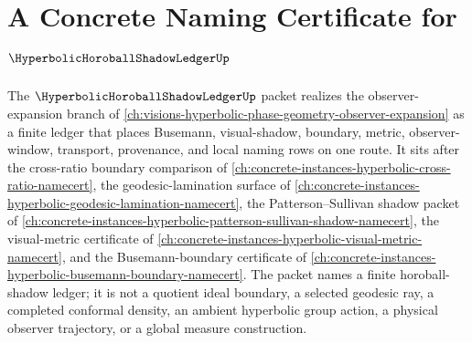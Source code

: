 \chapter{A Concrete Naming Certificate for $\HyperbolicHoroballShadowLedgerUp$}
\label{ch:concrete-instances-hyperbolic-horoball-shadow-ledger-namecert}

The $\HyperbolicHoroballShadowLedgerUp$ packet realizes the observer-expansion branch of \autoref{ch:visions-hyperbolic-phase-geometry-observer-expansion} as a finite ledger that places Busemann, visual-shadow, boundary, metric, observer-window, transport, provenance, and local naming rows on one route. It sits after the cross-ratio boundary comparison of \autoref{ch:concrete-instances-hyperbolic-cross-ratio-namecert}, the geodesic-lamination surface of \autoref{ch:concrete-instances-hyperbolic-geodesic-lamination-namecert}, the Patterson--Sullivan shadow packet of \autoref{ch:concrete-instances-hyperbolic-patterson-sullivan-shadow-namecert}, the visual-metric certificate of \autoref{ch:concrete-instances-hyperbolic-visual-metric-namecert}, and the Busemann-boundary certificate of \autoref{ch:concrete-instances-hyperbolic-busemann-boundary-namecert}. The packet names a finite horoball-shadow ledger; it is not a quotient ideal boundary, a selected geodesic ray, a completed conformal density, an ambient hyperbolic group action, a physical observer trajectory, or a global measure construction.

